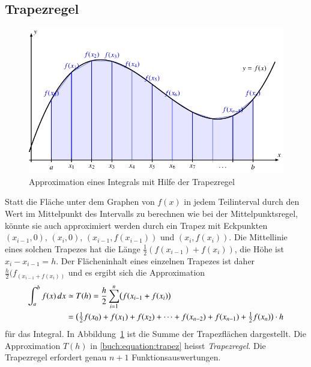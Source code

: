 \subsection{Trapezregel
\label{buch:subsection:trapez}}
\begin{figure}
\centering
\includegraphics{chapters/40-integration/figures/trapez.pdf}
\caption{Approximation eines Integrals mit Hilfe der Trapezregel
\label{buch:figure:trapez}}
\end{figure}
Statt die Fläche unter dem Graphen von $f(x)$ in jedem Teilinterval
durch den Wert im Mittelpunkt des Intervalls zu berechnen wie bei der
Mittelpunktsregel, könnte sie auch approximiert werden durch ein
Trapez mit Eckpunkten $(x_{i-1},0)$, $(x_i,0)$,
$(x_{i-1},f(x_{i-1}))$ und
$(x_i,f(x_i))$.
Die Mittellinie eines solchen Trapezes hat die Länge
$\frac12(f(x_{i-1}) +f(x_i))$, die Höhe ist $x_i-x_{i-1}=h$.
Der Flächeninhalt eines einzelnen Trapezes ist daher
$\frac{h}2(f_(x_{i-1}+f(x_i))$ und es ergibt sich die Approximation
\begin{align}
\int_a^b
f(x)\,dx
&\simeq
T(h)
=
\frac{h}2
\sum_{i=1}^n \bigl(f(x_{i-1} + f(x_i)\bigr)
\notag
\\
&=
\bigl(
{\textstyle\frac12}f(x_0) + f(x_1) + f(x_2)
+ \dots
+ f(x_{n-2}) + f(x_{n-1}) + {\textstyle\frac12} f(x_n)
\bigr)\cdot h
\label{buch:equation:trapez}
\end{align}
für das Integral.
In Abbildung~\ref{buch:figure:trapez} ist die Summe der Trapezflächen 
dargestellt.
Die Approximation $T(h)$ in \eqref{buch:equation:trapez} heisst
{\em Trapezregel}.
%
Die Trapezregel erfordert genau $n+1$ Funktionsauswertungen.

